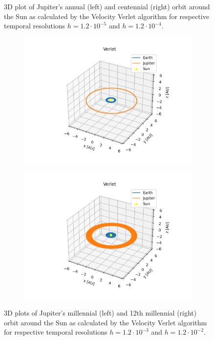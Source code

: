 \begin{figure}[h!]
\begin{subfigure}{0.48\linewidth}
		\end{subfigure}
		\caption{3D plot of Jupiter's annual (left) and centennial (right) orbit around the Sun as calculated by the Velocity Verlet algorithm for respective temporal resolutions $h = 1.2\cdot10^{-5}$ and $h = 1.2\cdot10^{-4}$.}
		\label{jupiter12and120}
	\end{figure}
	\begin{figure}[h!]
		\centering
		\begin{subfigure}{0.45\linewidth}
			\includegraphics[width=1.2\linewidth]{Figure/threebodynormalmass1200.png}
		\end{subfigure}
		\begin{subfigure}{0.45\linewidth}
			\includegraphics[width=1.2\linewidth]{Figure/threebodynormalmass12000.png}
		\end{subfigure}
		\caption{3D plots of Jupiter's millennial (left) and 12th millennial (right) orbit around the Sun as calculated by the Velocity Verlet algorithm for respective temporal resolutions $h = 1.2\cdot10^{-3}$ and $h = 1.2\cdot10^{-2}$.}
		\label{jupiter1200and12000}
	\end{figure}
